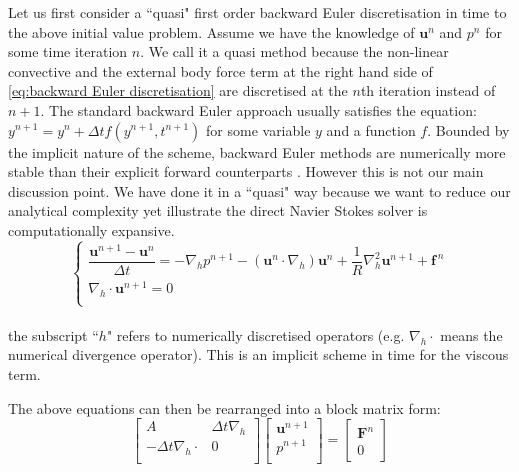 Let us first consider a ``quasi" first order backward Euler discretisation in time to the above initial value problem. Assume we have the knowledge of $\textbf{u}^n$ and $p^n$ for some time iteration $n$. We call it a quasi method because the non-linear convective and the external body force term at the right hand side of \eqref{eq:backward Euler discretisation} are discretised at the $n$th iteration instead of $n+1$. The standard backward Euler approach usually satisfies the equation: $y^{n+1} = y^n + \Delta t f(y^{n+1},t^{n+1})$ for some variable $y$ and a function $f$. Bounded by the implicit nature of the scheme, backward Euler methods are numerically more stable than their explicit forward counterparts \cite{gear1971simultaneous}. However this is not our main discussion point. We have done it in a ``quasi" way because we want to reduce our analytical complexity yet illustrate the direct Navier Stokes solver is computationally expansive.\\

\begin{equation}\label{eq:backward Euler discretisation}
\begin{cases}
\dfrac{\textbf{u}^{n+1} - \textbf{u}^n}{\Delta t} = - \nabla_h p^{n+1} - (\textbf{u}^n\cdot\nabla_h)\textbf{u}^n + \dfrac{1}{R}\nabla_h^2\textbf{u}^{n+1} + \textbf{f}^{\,n}\\
\nabla_h \cdot \textbf{u}^{n+1} = 0\\
\end{cases}
\end{equation}\\

the subscript ``$h$" refers to numerically discretised operators (e.g. $\nabla_h \cdot$ means the numerical divergence operator).
This is an implicit scheme in time for the viscous term.

The above equations can then be rearranged into a block matrix form:\\
\begin{equation}\label{backward Euler matrix form}
\begin{bmatrix}
A & \Delta t \nabla_h\\
-\Delta t \nabla_h \cdot & 0\\
\end{bmatrix}
\begin{bmatrix}
\textbf{u}^{n+1}\\
p^{n+1}\\
\end{bmatrix}
= \begin{bmatrix}
\textbf{F}^n\\
0
\end{bmatrix}
\end{equation}\\

